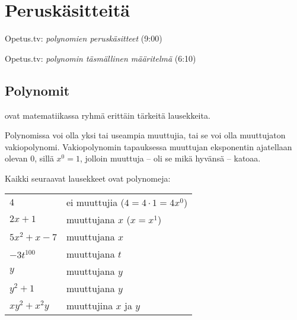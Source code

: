 \section{Peruskäsitteitä}

{Opetus.tv: \emph{polynomien peruskäsitteet} (9:00)}

{Opetus.tv: \emph{polynomin täsmällinen määritelmä} (6:10)}

\subsection*{Polynomit}

 ovat matematiikassa ryhmä erittäin tärkeitä lausekkeita.



Polynomissa voi olla yksi tai useampia muuttujia, tai se voi olla muuttujaton vakiopolynomi. Vakiopolynomin tapauksessa muuttujan eksponentin ajatellaan olevan $0$, sillä $x^0=1$, jolloin muuttuja -- oli se mikä hyvänsä -- katoaa.

\begin{esimerkki}
Kaikki seuraavat lausekkeet ovat polynomeja:

\begin{tabular}{ll}
$4$ &  ei muuttujia ($4=4\cdot 1 = 4x^0$)\\
$2x+1$ &  muuttujana $x$ ($x=x^1$)\\
$5x^2+x-7$ &   muuttujana $x$\\
$-3t^{100}$& muuttujana $t$\\
$y$& muuttujana $y$\\
$y^2+1$& muuttujana $y$\\
$xy^2+x^2y$& muuttujina $x$ ja $y$
\end{tabular}

\end{esimerkki}

